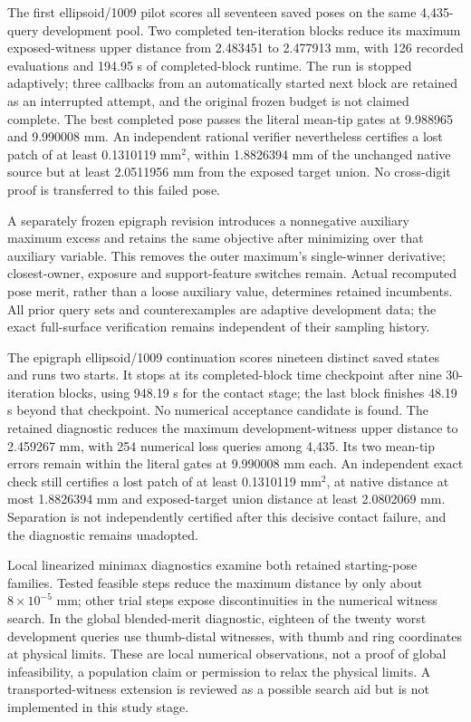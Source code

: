 \documentclass[10pt,letterpaper]{article}
\begin{document}
The first ellipsoid/1009 pilot scores all seventeen saved poses on the same
4,435-query development pool. Two completed ten-iteration blocks reduce its
maximum exposed-witness upper distance from 2.483451 to 2.477913 mm, with
126 recorded evaluations and 194.95 s of completed-block runtime. The run is
stopped adaptively; three callbacks from an automatically started next block
are retained as an interrupted attempt, and the original frozen budget is not
claimed complete. The best completed pose passes the literal mean-tip gates
at 9.988965 and 9.990008 mm. An independent rational verifier nevertheless
certifies a lost patch of at least 0.1310119 $\mathrm{mm}^2$, within
1.8826394 mm of the unchanged native source but at least 2.0511956 mm from the
exposed target union. No cross-digit proof is transferred to this failed pose.

A separately frozen epigraph revision introduces a nonnegative auxiliary
maximum excess and retains the same objective after minimizing over that
auxiliary variable. This removes the outer maximum's single-winner derivative;
closest-owner, exposure and support-feature switches remain. Actual recomputed
pose merit, rather than a loose auxiliary value, determines retained incumbents.
All prior query sets and counterexamples are adaptive development data; the
exact full-surface verification remains independent of their sampling history.

The epigraph ellipsoid/1009 continuation scores nineteen distinct saved states
and runs two starts. It stops at its
completed-block time checkpoint after nine 30-iteration blocks, using 948.19 s
for the contact stage; the last
block finishes 48.19 s beyond that checkpoint. No numerical acceptance candidate
is found. The retained diagnostic reduces the maximum development-witness
upper distance to 2.459267 mm, with 254 numerical loss queries among 4,435.
Its two mean-tip errors remain within the literal gates at 9.990008 mm each.
An independent exact check still certifies a lost patch of at least 0.1310119
$\mathrm{mm}^2$, at native distance at most 1.8826394 mm and exposed-target
union distance at least 2.0802069 mm. Separation is not independently certified
after this decisive contact failure, and the diagnostic remains unadopted.

Local linearized minimax diagnostics examine both retained starting-pose
families. Tested feasible steps reduce the maximum distance by only about
$8\times10^{-5}$ mm; other trial steps expose discontinuities in the numerical
witness search. In the global blended-merit diagnostic, eighteen of the twenty
worst development queries use thumb-distal witnesses, with thumb and ring
coordinates at physical limits. These are local numerical observations, not a
proof of global infeasibility, a population claim or permission to relax the
physical limits. A transported-witness extension is reviewed as a possible
search aid but is not implemented in this study stage.
\end{document}
